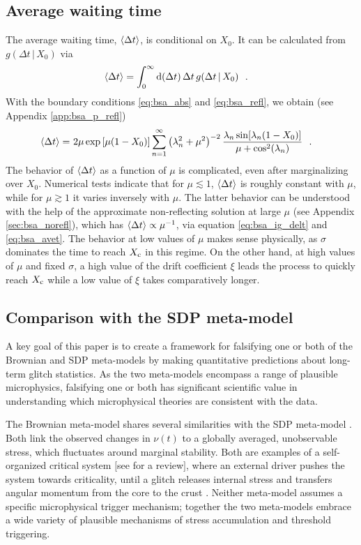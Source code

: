 \subsection{Average waiting time}
\label{sec:bsa_avet}
The average waiting time, $\langle \Delta t \rangle$, is conditional on $X_0$. It can be calculated from $g(\Delta t \,|\, X_0)$ via
\begin{align}
\label{eq:bsa_avet}
\langle \Delta t \rangle &= \int_0^\infty\textrm{d} (\Delta t)\, \Delta t\, g(\Delta t \,|\, X_0) \ \ .
\end{align}
With the boundary conditions \eqref{eq:bsa_abs} and \eqref{eq:bsa_refl}, we obtain (see Appendix \ref{app:bsa_p_refl})
\begin{align}
\langle \Delta t \rangle =&~ 2 \mu \exp\left[\mu(1 - X_0)\right] \sum_{n=1}^\infty \left(\lambda_n^2 + \mu^2\right)^{-2}  \frac{\lambda_n \sin[\lambda_n(1 - X_0)]}{\mu + \cos^2(\lambda_n)}\ \ .
\end{align}
The behavior of $\langle \Delta t \rangle$ as a function of $\mu$ is complicated, even after marginalizing over $X_0$. Numerical tests indicate that for $\mu \lesssim 1$, $\langle \Delta t \rangle$ is roughly constant with $\mu$, while for $\mu \gtrsim 1$ it varies inversely with $\mu$. The latter behavior can be understood with the help of the approximate non-reflecting solution at large $\mu$ (see Appendix \ref{sec:bsa_norefl}), which has $\langle \Delta t \rangle \propto \mu^{-1}$, via equation \eqref{eq:bsa_ig_delt} and \eqref{eq:bsa_avet}. The behavior at low values of $\mu$ makes sense physically, as $\sigma$ dominates the time to reach $X_\textrm{c}$ in this regime. On the other hand, at high values of $\mu$ and fixed $\sigma$, a high value of the drift coefficient $\xi$ leads the process to quickly reach $X_\textrm{c}$ while a low value of $\xi$ takes comparatively longer.

\subsection{Comparison with the SDP meta-model}
\label{sec:bsa_sdp_comp}
A key goal of this paper is to create a framework for falsifying one or both of the Brownian and SDP meta-models by making quantitative predictions about long-term glitch statistics. As the two meta-models encompass a range of plausible microphysics, falsifying one or both has significant scientific value in understanding which microphysical theories are consistent with the data.

The Brownian meta-model shares several similarities with the SDP meta-model \citep{Fulgenzi2017,Melatos2018,Carlin2019quasi,Carlin2019ac}. Both link the observed changes in $\nu(t)$ to a globally averaged, unobservable stress, which fluctuates around marginal stability. Both are examples of a self-organized critical system $[$see \citet{Aschwanden2018} for a review$]$, where an external driver pushes the system towards criticality, until a glitch releases internal stress and transfers angular momentum from the core to the crust \citep{Jensen1998}. Neither meta-model assumes a specific microphysical trigger mechanism; together the two meta-models embrace a wide variety of plausible mechanisms of stress accumulation and threshold triggering.

